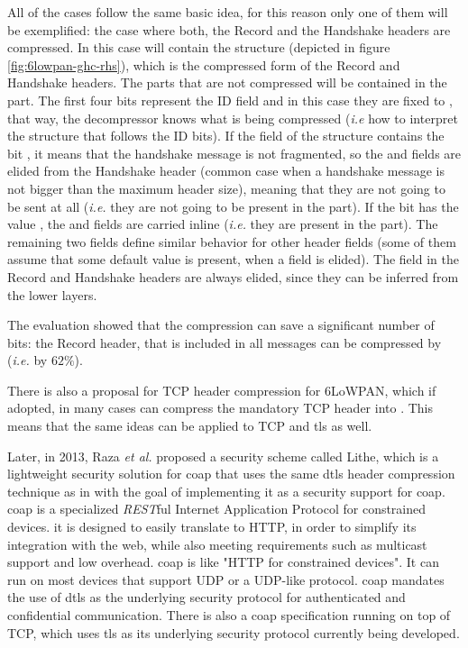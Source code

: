 \documentclass{llncs}
\begin{document}
{All of the cases follow the same basic idea, for this reason only one of them will be exemplified:
the case where both, the Record and the Handshake headers are compressed.
In this case  will contain the 
structure (depicted in figure \ref{fig:6lowpan-ghc-rhs}), which is the compressed form of the Record and Handshake headers. The
parts that are not compressed will be contained in the  part.
The first four bits represent the ID field and in this case they are fixed to ,
that way, the decompressor knows what is being compressed (\textit{i.e} how to interpret
the structure that follows the ID bits). If the  field of the  structure contains the
bit , it means that the handshake message is not fragmented, so
the  and  fields are
elided from the Handshake header (common case when a handshake message is not bigger than
the maximum header size), meaning that they are not going to be sent at
all (\textit{i.e.} they are not going to be present in the  part).
If the  bit has the value , the 
and  fields are carried inline (\textit{i.e.} they are
present in the  part). The remaining two fields define similar
behavior for other header fields (some of them assume that some default value is present, when a field is elided).
The  field in the Record and Handshake headers are always elided,
since they can be inferred from the lower layers.

The evaluation showed that the compression can save a significant number of bits:
the Record header, that is included in all messages can be compressed by 
(\textit{i.e.} by $62\%$).

There is also a proposal for TCP header compression for 6LoWPAN\cite{I-D.aayadi-6lowpan-tcphc},
which if adopted, in many cases can compress the mandatory  TCP header
into . This means that the same ideas can be applied to TCP and
\gls{tls} as well.

Later, in 2013, Raza \textit{et al.} proposed a security scheme called Lithe\cite{LitheLig40:online},
which is a lightweight security solution for \gls{coap} that uses the same \gls{dtls} header
compression technique as in \cite{6LoWPANC53:online} with the goal of implementing
it as a security support for \gls{coap}. \gls{coap}\cite{RFC7959} is a specialized
\textit{REST}ful Internet Application Protocol for constrained devices. it is designed to easily
translate to HTTP, in order to simplify its integration with the web,
while also meeting requirements such as multicast support and low overhead.
\gls{coap} is like "HTTP for constrained devices".
It can run on most devices that support UDP or a UDP-like protocol.
\gls{coap} mandates the use of \gls{dtls} as the underlying security protocol for
authenticated and confidential communication. There is also a \gls{coap} specification
running on top of TCP, which uses \gls{tls} as its underlying security protocol
currently being developed\cite{I-D.ietf-core-coap-tcp-tls}.

}
\end{document}
